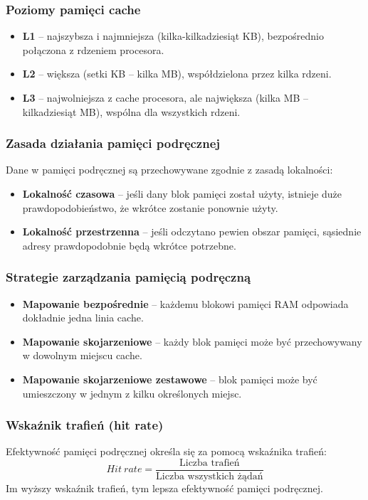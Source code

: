 \subsubsection{Poziomy pamięci cache}
\begin{itemize}
    \item \textbf{L1} – najszybsza i najmniejsza (kilka-kilkadziesiąt KB), bezpośrednio połączona z rdzeniem procesora.
    \item \textbf{L2} – większa (setki KB – kilka MB), współdzielona przez kilka rdzeni.
    \item \textbf{L3} – najwolniejsza z cache procesora, ale największa (kilka MB – kilkadziesiąt MB), wspólna dla wszystkich rdzeni.
\end{itemize}

\subsubsection{Zasada działania pamięci podręcznej}
Dane w pamięci podręcznej są przechowywane zgodnie z zasadą lokalności:
\begin{itemize}
    \item \textbf{Lokalność czasowa} – jeśli dany blok pamięci został użyty, istnieje duże prawdopodobieństwo, że wkrótce zostanie ponownie użyty.
    \item \textbf{Lokalność przestrzenna} – jeśli odczytano pewien obszar pamięci, sąsiednie adresy prawdopodobnie będą wkrótce potrzebne.
\end{itemize}

\subsubsection{Strategie zarządzania pamięcią podręczną}
\begin{itemize}
    \item \textbf{Mapowanie bezpośrednie} – każdemu blokowi pamięci RAM odpowiada dokładnie jedna linia cache.
    \item \textbf{Mapowanie skojarzeniowe} – każdy blok pamięci może być przechowywany w dowolnym miejscu cache.
    \item \textbf{Mapowanie skojarzeniowe zestawowe} – blok pamięci może być umieszczony w jednym z kilku określonych miejsc.
\end{itemize}

\subsubsection{Wskaźnik trafień (hit rate)}
Efektywność pamięci podręcznej określa się za pomocą wskaźnika trafień:
\[
Hit\ rate = \frac{\text{Liczba trafień}}{\text{Liczba wszystkich żądań}}
\]
Im wyższy wskaźnik trafień, tym lepsza efektywność pamięci podręcznej.

